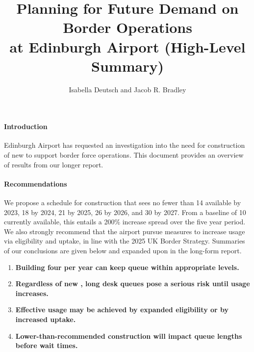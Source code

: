 \documentclass[10pt]{article}
\title{Planning for Future Demand on Border Operations\\ at Edinburgh Airport (High-Level Summary)}
\author{Isabella Deutsch and Jacob R. Bradley}
\date{}
\begin{document}
\maketitle
\thispagestyle{empty}

\vspace{-15pt}
\paragraph{Introduction}
Edinburgh Airport has requested an investigation into the need for construction of new  to support border force operations. This document provides an overview of results from our longer report.

\paragraph{Recommendations}
We propose a schedule for  construction that sees no fewer than 14  available by 2023, 18 by 2024, 21 by 2025, 26 by 2026, and 30 by 2027. From a baseline of 10  currently available, this entails a 200\% increase spread over the five year period. We also strongly recommend that the airport pursue measures to increase  usage via eligibility and uptake, in line with the 2025 UK Border Strategy. Summaries of our conclusions are given below and expanded upon in the long-form report.
\begin{tcolorbox}[
colframe=edi-dark-purple,
colback=edi-light-purple,
fonttitle=\bfseries,
title = {Report Highlights}]
\begin{enumerate}[itemsep=-1ex]

    \item \textbf{Building four  per year can keep  queue  within appropriate levels.}\\
    \item \textbf{Regardless of new , long desk queues pose a serious risk until  usage increases.}\\
    \item \textbf{Effective  usage may be achieved by expanded eligibility or by increased uptake.}\\
    \item \textbf{Lower-than-recommended  construction will impact queue lengths before wait times.}
\end{enumerate}
\end{tcolorbox}
\end{document}
